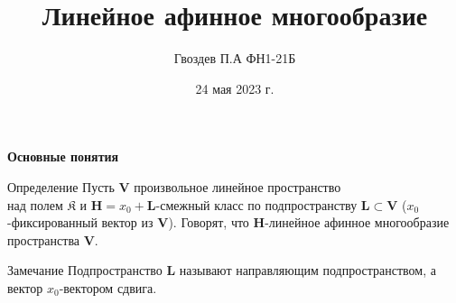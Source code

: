 \documentclass{beamer}
\title[Линейное афинное многообразие]{\textbf{Линейное афинное многообразие}}
\author{Гвоздев П.А ФН1-21Б}
\date{24 мая 2023 г.}
\begin{document}
\frame{\titlepage}







\begin{frame}{\textbf{Основные понятия}}

\begin{block}{Определение}
Пусть $\mathbf{V}$ произвольное линейное пространство\\
над полем $\mathfrak{K}$ и $\mathbf{H}=x_0+\mathbf{L}$-смежный класс по подпространству $\mathbf{L}\subset \mathbf{V}$ ($x_0$-фиксированный  вектор из $\mathbf{V}$). Говорят, что $\mathbf{H}$-линейное афинное многообразие пространства $\mathbf{V}$.
\end{block}

\begin{block}{Замечание}
Подпространство $\mathbf{L}$ называют направляющим подпространством,
а вектор $x_0$-вектором сдвига.
\end{block}


\end{frame}
\end{document}
